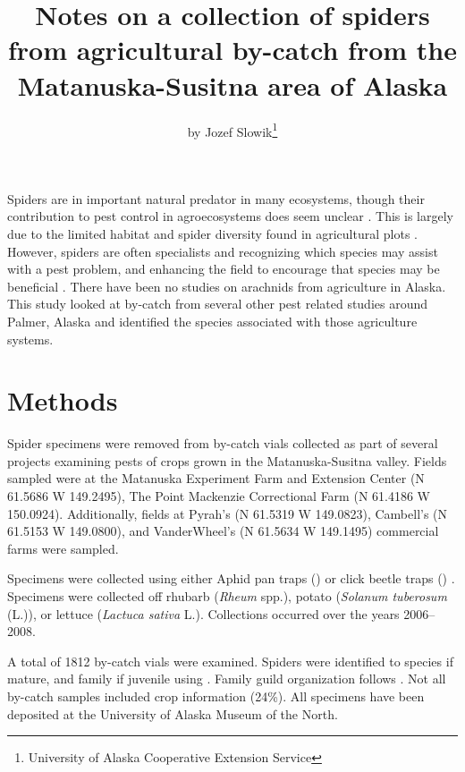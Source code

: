 \title{Notes on a collection of spiders from agricultural by-catch from the Matanuska-Susitna area of Alaska}

\author{by Jozef Slowik\footnote{University of Alaska Cooperative Extension Service}}

\maketitle

Spiders are in important natural predator in many ecosystems, though their contribution to pest control in agroecosystems does seem unclear \citep{NyffelerBirkhofer2017}. This is largely due to the limited habitat and spider diversity found in agricultural plots \citep{NyffelerSunderland2003}. However, spiders are often specialists and recognizing which species may assist with a pest problem, and enhancing the field to encourage that species may be beneficial \citep{Rypstraetal1999}. There have been no studies on arachnids from agriculture in Alaska. This study looked at by-catch from several other pest related studies around Palmer, Alaska and identified the species associated with those agriculture systems.

\section{Methods}

Spider specimens were removed from by-catch vials collected as part of several  projects examining pests of crops grown in the Matanuska-Susitna valley. Fields sampled were at the Matanuska Experiment Farm and Extension Center (N 61.5686\textdegree{} W 149.2495\textdegree{}), The Point Mackenzie Correctional Farm (N 61.4186\textdegree{} W 150.0924\textdegree{}). Additionally, fields at Pyrah’s (N 61.5319\textdegree{} W 149.0823\textdegree{}), Cambell’s (N 61.5153\textdegree{} W 149.0800\textdegree{}), and VanderWheel’s (N 61.5634\textdegree{} W 149.1495\textdegree{}) commercial farms were sampled. 

Specimens were collected using either Aphid pan traps () \citep{Pantojaetal2010a} or click beetle traps () \citep{Pantojaetal2010b}. Specimens were collected off rhubarb (\textit{Rheum} spp.), potato (\textit{Solanum tuberosum} (L.)), or lettuce (\textit{Lactuca sativa} L.). Collections occurred over the years 2006--2008. 

A total of 1812 by-catch vials were examined. Spiders were identified to species if mature, and family if juvenile using \citet{Ubicketal2005}. 
Family guild organization follows \citet{Uetzetal1999}. Not all by-catch samples included crop information (24\%). All specimens have been deposited at the University of Alaska Museum of the North.

